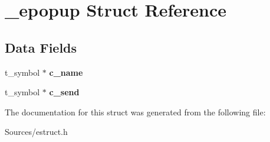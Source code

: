 \hypertarget{struct__epopup}{\section{\-\_\-epopup Struct Reference}
\label{struct__epopup}
}
\subsection*{Data Fields}
\begin{DoxyCompactItemize}
\item 
\hypertarget{struct__epopup_a6b1d595c3eed41231261cc949de6c059}{t\-\_\-symbol $\ast$ {\bfseries c\-\_\-name}}\label{struct__epopup_a6b1d595c3eed41231261cc949de6c059}

\item 
\hypertarget{struct__epopup_a8b8515ab22b24ef7b726fc06af1254fe}{t\-\_\-symbol $\ast$ {\bfseries c\-\_\-send}}\label{struct__epopup_a8b8515ab22b24ef7b726fc06af1254fe}

\end{DoxyCompactItemize}


The documentation for this struct was generated from the following file\-:\begin{DoxyCompactItemize}
\item 
Sources/estruct.\-h\end{DoxyCompactItemize}
